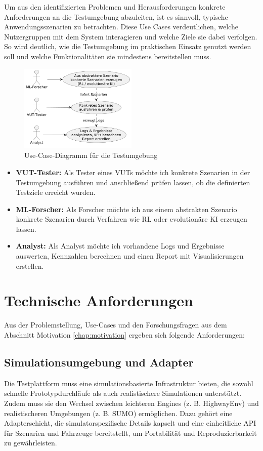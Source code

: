 Um aus den identifizierten Problemen und Herausforderungen konkrete Anforderungen an die Testumgebung abzuleiten, ist es sinnvoll, typische Anwendungsszenarien zu betrachten. Diese Use Cases verdeutlichen, welche Nutzergruppen mit dem System interagieren und welche Ziele sie dabei verfolgen. So wird deutlich, wie die Testumgebung im praktischen Einsatz genutzt werden soll und welche Funktionalitäten sie mindestens bereitstellen muss.

\begin{figure}[h]
    \centering
    \includegraphics[width=0.5\textwidth]{contents/figures/UseCaseDiagramm_InteProjekt.png}
    \caption{Use-Case-Diagramm für die Testumgebung}
    \label{fig:UseCaseDiagramm}
\end{figure}


\begin{itemize}
    \item \textbf{VUT-Tester:} Als Tester eines VUTs möchte ich konkrete Szenarien in der Testumgebung ausführen und anschließend prüfen lassen, ob die definierten Testziele erreicht wurden.
    \item \textbf{ML-Forscher:} Als Forscher möchte ich aus einem abstrakten Szenario konkrete Szenarien durch Verfahren wie RL oder evolutionäre KI erzeugen lassen.
    \item \textbf{Analyst:} Als Analyst möchte ich vorhandene Logs und Ergebnisse auswerten, Kennzahlen berechnen und einen Report mit Visualisierungen erstellen.
\end{itemize}

\section{Technische Anforderungen}

Aus der Problemstellung, Use-Cases und den Forschungsfragen aus dem Abschnitt Motivation \ref{chap:motivation} ergeben sich folgende Anforderungen:

\subsection{Simulationsumgebung und Adapter}
Die Testplattform muss eine simulationsbasierte Infrastruktur bieten, die sowohl schnelle Prototypdurchläufe als auch realistischere Simulationen unterstützt. Zudem muss sie den Wechsel zwischen leichteren Engines (z. B. HighwayEnv) und realistischeren Umgebungen (z. B. SUMO) ermöglichen. Dazu gehört eine Adapterschicht, die simulatorspezifische Details kapselt und eine einheitliche API für Szenarien und Fahrzeuge bereitstellt, um Portabilität und Reproduzierbarkeit zu gewährleisten.


